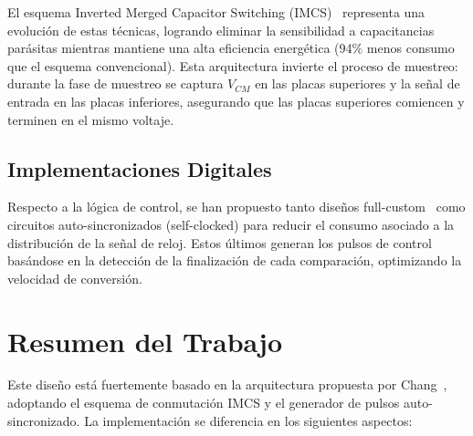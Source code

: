 \documentclass[12pt,a4paper]{report}
\begin{document}
El esquema Inverted Merged Capacitor Switching (IMCS)~\cite{chang_sar_thesis} representa una evolución de estas técnicas, logrando eliminar la sensibilidad a capacitancias parásitas mientras mantiene una alta eficiencia energética (94\% menos consumo que el esquema convencional). Esta arquitectura invierte el proceso de muestreo: durante la fase de muestreo se captura $V_{CM}$ en las placas superiores y la señal de entrada en las placas inferiores, asegurando que las placas superiores comiencen y terminen en el mismo voltaje.

\subsection{Implementaciones Digitales}

Respecto a la lógica de control, se han propuesto tanto diseños full-custom~\cite{murmann_sar} como circuitos auto-sincronizados (self-clocked) para reducir el consumo asociado a la distribución de la señal de reloj. Estos últimos generan los pulsos de control basándose en la detección de la finalización de cada comparación, optimizando la velocidad de conversión.

\section{Resumen del Trabajo}

Este diseño está fuertemente basado en la arquitectura propuesta por Chang~\cite{chang_sar_thesis}, adoptando el esquema de conmutación IMCS y el generador de pulsos auto-sincronizado. La implementación se diferencia en los siguientes aspectos:
\end{document}
